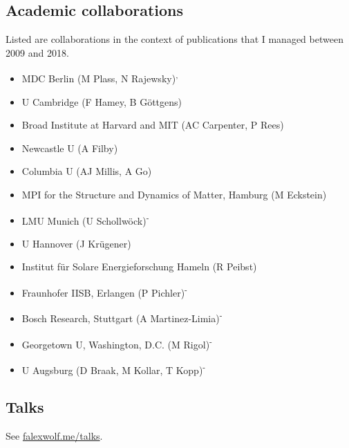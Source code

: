 \subsection*{Academic collaborations}
Listed are collaborations in the context of publications that I managed between 2009 and 2018. 
\begin{itemize}
\item MDC Berlin (M Plass, N Rajewsky)\textsuperscript{,}
\item U Cambridge (F Hamey, B Göttgens)
\item Broad Institute at Harvard and MIT (AC Carpenter, P Rees)
\item Newcastle U (A Filby)
\item Columbia U (AJ Millis, A Go)
\item MPI for the Structure and Dynamics of Matter, Hamburg (M Eckstein)
\item LMU Munich (U Schollwöck)\textsuperscript{-}
\item U Hannover (J Krügener)
\item Institut für Solare Energieforschung Hameln (R Peibst)
\item Fraunhofer IISB, Erlangen (P Pichler)\textsuperscript{-}
\item Bosch Research, Stuttgart (A Martinez-Limia)\textsuperscript{-}
\item Georgetown U, Washington, D.C. (M Rigol)\textsuperscript{-}
\item U Augsburg (D Braak, M Kollar, T Kopp)\textsuperscript{-}
\end{itemize}


\subsection*{Talks}
See \href{http://falexwolf.me/talks/}{falexwolf.me/talks}.
